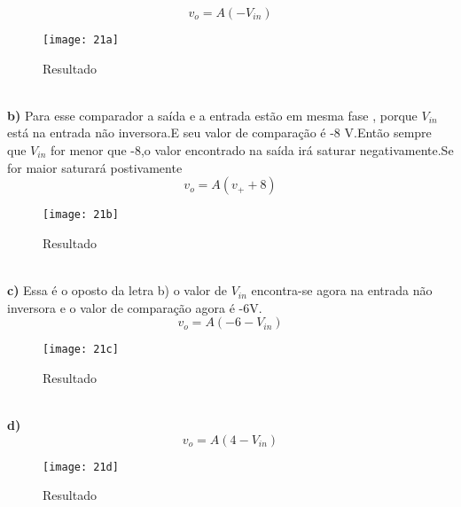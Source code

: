 \documentclass[11pt,a4paper]{article}
\begin{document}
$$v_o=A(-V_{in})$$
\begin{figure}[!h]
\begin{center}
\texttt{[image: 21a]}
\caption{Resultado}
\end{center}
\end{figure}
\\
\newpage
\textbf{b) }
Para esse comparador a saída e a entrada estão em mesma fase , porque $V_{in}$ está na entrada não inversora.E seu valor de comparação é -8 V.Então sempre que $V_{in}$ for menor que -8,o valor encontrado na saída irá saturar negativamente.Se for maior saturará postivamente 
$$v_o=A(v_+ +8)$$
\begin{figure}[!h]
\begin{center}
\texttt{[image: 21b]}
\caption{Resultado}
\end{center}
\end{figure}
\\
\newpage
\textbf{c) }
Essa é o oposto da letra b) o valor de $V_{in}$ encontra-se agora na entrada não inversora e o valor de comparação agora é -6V.
$$v_o=A(-6-V_{in})$$
\begin{figure}[!h]
\begin{center}
\texttt{[image: 21c]}
\caption{Resultado}
\end{center}
\end{figure}
\\
\newpage
\textbf{d) }
$$v_o=A(4 -V_{in})$$
\begin{figure}[!h]
\begin{center}
\texttt{[image: 21d]}
\caption{Resultado}
\end{center}
\end{figure}
\\
\newpage
\end{document}
